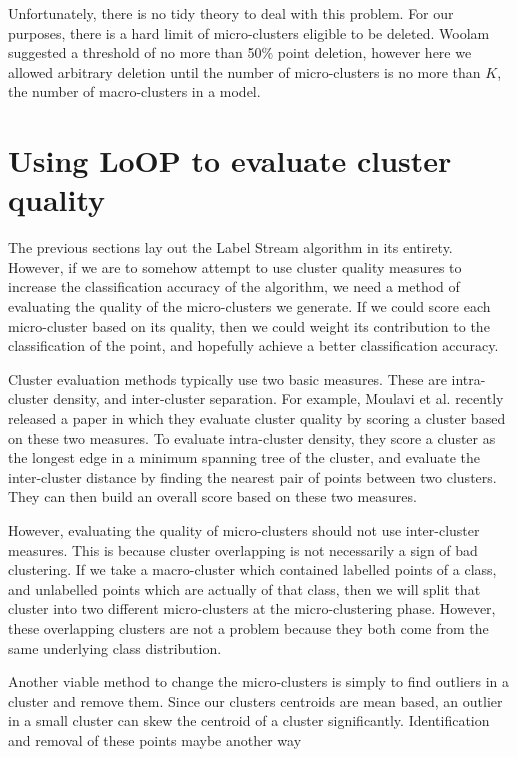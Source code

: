 \documentclass[12pt,a4paper,oneside]{report}
\begin{document}
Unfortunately, there is no tidy theory to deal with this problem. For our purposes, there is a hard limit of micro-clusters eligible to be deleted. Woolam suggested a threshold of no more than 50$\%$ point deletion, however here we allowed arbitrary deletion until the number of micro-clusters is no more than $K$, the number of macro-clusters in a model. 

\section{Using LoOP to evaluate cluster quality}

The previous sections lay out the Label Stream algorithm in its entirety. However, if we are to somehow attempt to use cluster quality measures to increase the classification accuracy of the algorithm, we need a method of evaluating the quality of the micro-clusters we generate. If we could score each micro-cluster based on its quality, then we could weight its contribution to the classification of the point, and hopefully achieve a better classification accuracy. 

Cluster evaluation methods typically use two basic measures. These are intra-cluster density, and inter-cluster separation. For example, Moulavi et al\cite{DBCV}. recently released a paper in which they evaluate cluster quality by scoring a cluster based on these two measures. To evaluate intra-cluster density, they score a cluster as the longest edge in a minimum spanning tree of the cluster, and evaluate the inter-cluster distance by finding the nearest pair of points between two clusters. They can then build an overall score based on these two measures. 

However, evaluating the quality of micro-clusters should not use inter-cluster measures. This is because cluster overlapping is not necessarily a sign of bad clustering. If we take a macro-cluster which contained labelled points of a class, and unlabelled points which are actually of that class, then we will split that cluster into two different micro-clusters at the micro-clustering phase. However, these overlapping clusters are not a problem because they both come from the same underlying class distribution. 

Another viable method to change the micro-clusters is simply to find outliers in a cluster and remove them. Since our clusters centroids are mean based, an outlier in a small cluster can skew the centroid of a cluster significantly. Identification and removal of these points maybe another way 
\end{document}
